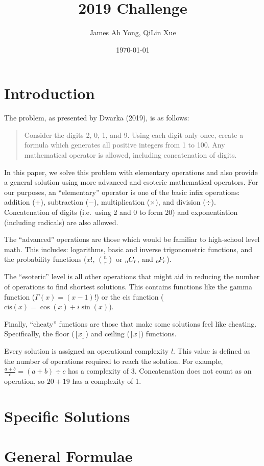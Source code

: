 \documentclass{article}
\title{2019 Challenge}
\author{James Ah Yong, QiLin Xue}
\date\today
\DeclarePairedDelimiter\ceil{\lceil}{\rceil}
\DeclarePairedDelimiter\floor{\lfloor}{\rfloor}
\newcommand*{\permcomb}[4][0mu]{{{}_{#3}\mkern#1#2_{#4}}}
\newcommand*{\perm}[1][-3mu]{\permcomb[#1]{P}}
\newcommand*{\comb}[1][-1mu]{\permcomb[#1]{C}}
\begin{document}
\maketitle

\section{Introduction}

The problem, as presented by Dwarka (2019), is as follows:

\begin{quotation}
  Consider the digits 2, 0, 1, and 9.
  Using each digit only once, create a formula which generates all positive integers from 1 to 100.
  Any mathematical operator is allowed, including concatenation of digits.
\end{quotation}

In this paper, we solve this problem with elementary operations and also provide a general solution using more advanced and esoteric mathematical operators.
For our purposes, an ``elementary'' operator is one of the basic infix operations: addition ($+$), subtraction ($-$), multiplication ($\times$), and division ($\div$).
Concatenation of digits (i.e.\ using 2 and 0 to form 20) and exponentiation (including radicals) are also allowed.

The ``advanced'' operations are those which would be familiar to high-school level math.
This includes: logarithms, basic and inverse trigonometric functions, and the probability functions ($x!$, $\binom{n}{r}$ or $\comb{n}{r}$, and $\perm{n}{r}$).

The ``esoteric'' level is all other operations that might aid in reducing the number of operations to find shortest solutions.
This contains functions like the gamma function ($\Gamma(x) = (x-1)!$) or the cis function ($\mathrm{cis}(x) = \cos(x) + i \sin(x)$).

Finally, ``cheaty'' functions are those that make some solutions feel like cheating.
Specifically, the floor ($\floor{x}$) and ceiling ($\ceil{x}$) functions. 

Every solution is assigned an operational complexity $l$.
This value is defined as the number of operations required to reach the solution.
For example, $\frac{a+b}{c}=(a+b)\div c$ has a complexity of 3.
Concatenation does not count as an operation, so $20+19$ has a complexity of 1.

\section{Specific Solutions}



\section{General Formulae}


\end{document}
